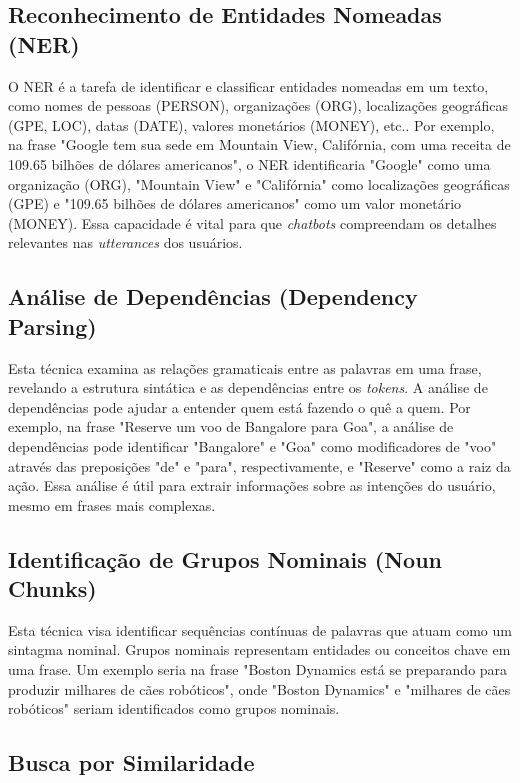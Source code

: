 \documentclass[14pt,a4paper,oneside]{book}
\begin{document}
\subsection{Reconhecimento de Entidades Nomeadas (NER)}

O NER é a tarefa de identificar e classificar entidades nomeadas em um texto, como nomes de pessoas (PERSON), organizações (ORG), localizações geográficas (GPE, LOC), datas (DATE), valores monetários (MONEY), etc.. Por exemplo, na frase "Google tem sua sede em Mountain View, Califórnia, com uma receita de 109.65 bilhões de dólares americanos", o NER identificaria "Google" como uma organização (ORG), "Mountain View" e "Califórnia" como localizações geográficas (GPE) e "109.65 bilhões de dólares americanos" como um valor monetário (MONEY). Essa capacidade é vital para que \textit{chatbots} compreendam os detalhes relevantes nas \textit{utterances} dos usuários.

\subsection{Análise de Dependências (Dependency Parsing)}

Esta técnica examina as relações gramaticais entre as palavras em uma frase, revelando a estrutura sintática e as dependências entre os \textit{tokens}. A análise de dependências pode ajudar a entender quem está fazendo o quê a quem. Por exemplo, na frase "Reserve um voo de Bangalore para Goa", a análise de dependências pode identificar "Bangalore" e "Goa" como modificadores de "voo" através das preposições "de" e "para", respectivamente, e "Reserve" como a raiz da ação. Essa análise é útil para extrair informações sobre as intenções do usuário, mesmo em frases mais complexas.

\subsection{Identificação de Grupos Nominais (Noun Chunks)}

Esta técnica visa identificar sequências contínuas de palavras que atuam como um sintagma nominal. Grupos nominais representam entidades ou conceitos chave em uma frase. Um exemplo seria na frase "Boston Dynamics está se preparando para produzir milhares de cães robóticos", onde "Boston Dynamics" e "milhares de cães robóticos" seriam identificados como grupos nominais.

\subsection{Busca por Similaridade}
\end{document}
